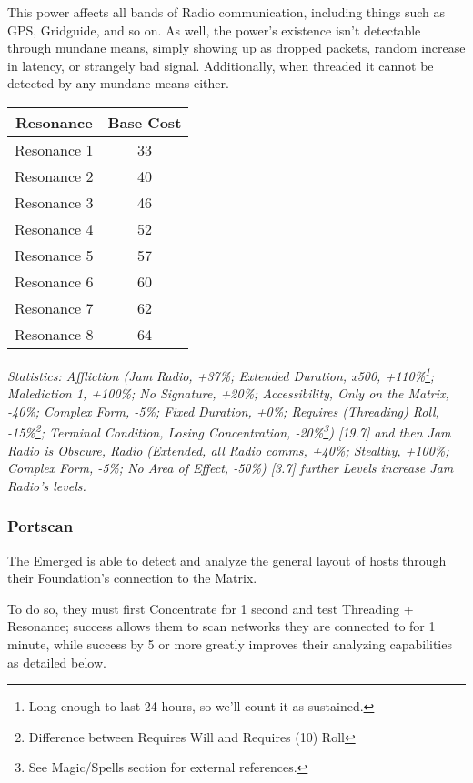\begin{multicols*}{3}
	This power affects all bands of Radio communication, including things such as GPS, Gridguide, and so on. As well, the power's existence isn't detectable through mundane means, simply showing up as dropped packets, random increase in latency, or strangely bad signal. Additionally, when threaded it cannot be detected by any mundane means either.
	
	\begin{center}
		\begin{tabular}{|c|c|}
			\hline
			Resonance & Base Cost\\
			\hline
			\hline
			Resonance 1 & 33 \\
			Resonance 2 & 40 \\
			Resonance 3 & 46 \\
			Resonance 4 & 52 \\
			Resonance 5 & 57 \\
			Resonance 6 & 60 \\
			Resonance 7 & 62 \\
			Resonance 8 & 64 \\
			\hline
		\end{tabular}
	\end{center}
	
	\textcolor{OliveGreen}{\textit{Statistics: Affliction (Jam Radio, +37\%; Extended Duration, x500, +110\%\footnote{Long enough to last 24 hours, so we'll count it as sustained.}; Malediction 1, +100\%; No Signature, +20\%; Accessibility, Only on the Matrix, -40\%; Complex Form, -5\%; Fixed Duration, +0\%; Requires (Threading) Roll, -15\%\footnote{Difference between Requires Will and Requires (10) Roll}; Terminal Condition, Losing Concentration, -20\%\footnote{See Magic/Spells section for external references.}) [19.7] and then Jam Radio is Obscure, Radio (Extended, all Radio comms, +40\%; Stealthy, +100\%; Complex Form, -5\%; No Area of Effect, -50\%) [3.7] further Levels increase Jam Radio's levels.}}
	
	\subsubsection*{Portscan}\label{portscan}
	
	The Emerged is able to detect and analyze the general layout of hosts through their Foundation's connection to the Matrix.
	
	To do so, they must first Concentrate for 1 second and test Threading + Resonance; success allows them to scan networks they are connected to for 1 minute, while success by 5 or more greatly improves their analyzing capabilities as detailed below.
	

\end{multicols*}

